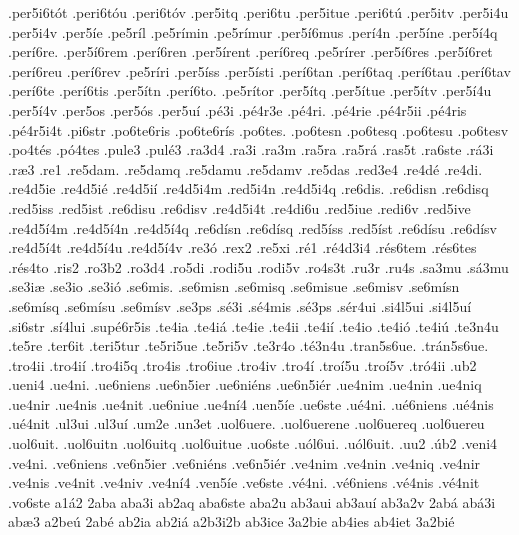 {.per5i6t^^f3t
.peri6t^^f3u
.peri6t^^f3v
.per5itq
.peri6tu
.per5itue
.peri6t^^fa
.per5itv
.per5i4u
.per5i4v
.per5^^ede
.pe5r^^edl
.pe5r^^edmin
.pe5r^^edmur
.per5^^ed6mus
.per^^ed4n
.per5^^edne
.per5^^ed4q
.per^^ed6re.
.per5^^ed6rem
.per^^ed6ren
.per5^^edrent
.per^^ed6req
.pe5r^^edrer
.per5^^ed6res
.per5^^ed6ret
.per^^ed6reu
.per^^ed6rev
.pe5r^^edri
.per5^^edss
.per5^^edsti
.per^^ed6tan
.per^^ed6taq
.per^^ed6tau
.per^^ed6tav
.per^^ed6te
.per^^ed6tis
.per5^^edtn
.per^^ed6to.
.pe5r^^edtor
.per5^^edtq
.per5^^edtue
.per5^^edtv
.per5^^ed4u
.per5^^ed4v
.per5os
.per5^^f3s
.per5u^^ed
.p^^e93i
.p^^e94r3e
.p^^e94ri.
.p^^e94rie
.p^^e94r5ii
.p^^e94ris
.p^^e94r5i4t
.pi6str
.po6te6ris
.po6te6r^^eds
.po6tes.
.po6tesn
.po6tesq
.po6tesu
.po6tesv
.po4t^^e9s
.p^^f34tes
.pule3
.pul^^e93
.ra3d4
.ra3i
.ra3m
.ra5ra
.ra5r^^e1
.ras5t
.ra6ste
.r^^e13i
.r^^e63
.re1
.re5dam.
.re5damq
.re5damu
.re5damv
.re5das
.red3e4
.re4d^^e9
.re4di.
.re4d5ie
.re4d5i^^e9
.re4d5i^^ed
.re4d5i4m
.red5i4n
.re4d5i4q
.re6dis.
.re6disn
.re6disq
.red5iss
.red5ist
.re6disu
.re6disv
.re4d5i4t
.re4di6u
.red5iue
.redi6v
.red5ive
.re4d5^^ed4m
.re4d5^^ed4n
.re4d5^^ed4q
.re6d^^edsn
.re6d^^edsq
.red5^^edss
.red5^^edst
.re6d^^edsu
.re6d^^edsv
.re4d5^^ed4t
.re4d5^^ed4u
.re4d5^^ed4v
.re3^^f3
.rex2
.re5xi
.r^^e91
.r^^e94d3i4
.r^^e9s6tem
.r^^e9s6tes
.r^^e9s4to
.ris2
.ro3b2
.ro3d4
.ro5di
.rodi5u
.rodi5v
.ro4s3t
.ru3r
.ru4s
.sa3mu
.s^^e13mu
.se3i^^e6
.se3io
.se3i^^f3
.se6mis.
.se6misn
.se6misq
.se6misue
.se6misv
.se6m^^edsn
.se6m^^edsq
.se6m^^edsu
.se6m^^edsv
.se3ps
.s^^e93i
.s^^e94mis
.s^^e93ps
.s^^e9r4ui
.si4l5ui
.si4l5u^^ed
.si6str
.s^^ed4lui
.sup^^e96r5is
.te4ia
.te4i^^e1
.te4ie
.te4ii
.te4i^^ed
.te4io
.te4i^^f3
.te4i^^fa
.te3n4u
.te5re
.ter6it
.teri5tur
.te5ri5ue
.te5ri5v
.te3r4o
.t^^e93n4u
.tran5s6ue.
.tr^^e1n5s6ue.
.tro4ii
.tro4i^^ed
.tro4i5q
.tro4is
.tro6iue
.tro4iv
.tro4^^ed
.tro^^ed5u
.tro^^ed5v
.tr^^f34ii
.ub2
.ueni4
.ue4ni.
.ue6niens
.ue6n5ier
.ue6ni^^e9ns
.ue6n5i^^e9r
.ue4nim
.ue4nin
.ue4niq
.ue4nir
.ue4nis
.ue4nit
.ue6niue
.ue4n^^ed4
.uen5^^ede
.ue6ste
.u^^e94ni.
.u^^e96niens
.u^^e94nis
.u^^e94nit
.ul3ui
.ul3u^^ed
.um2e
.un3et
.uol6uere.
.uol6uerene
.uol6uereq
.uol6uereu
.uol6uit.
.uol6uitn
.uol6uitq
.uol6uitue
.uo6ste
.u^^f3l6ui.
.u^^f3l6uit.
.uu2
.^^fab2
.veni4
.ve4ni.
.ve6niens
.ve6n5ier
.ve6ni^^e9ns
.ve6n5i^^e9r
.ve4nim
.ve4nin
.ve4niq
.ve4nir
.ve4nis
.ve4nit
.ve4niv
.ve4n^^ed4
.ven5^^ede
.ve6ste
.v^^e94ni.
.v^^e96niens
.v^^e94nis
.v^^e94nit
.vo6ste
a1^^e12
2aba
aba3i
ab2aq
aba6ste
aba2u
ab3aui
ab3au^^ed
ab3a2v
2ab^^e1
ab^^e13i
ab^^e63
a2be^^fa
2ab^^e9
ab2ia
ab2i^^e1
a2b3i2b
ab3ice
3a2bie
ab4ies
ab4iet
3a2bi^^e9
}
